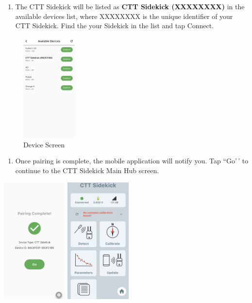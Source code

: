 \documentclass[
]{article}
\providecommand{\tightlist}{%
  \setlength{\itemsep}{0pt}\setlength{\parskip}{0pt}}
\begin{document}
\begin{enumerate}
\def\labelenumi{\arabic{enumi}.}
\setcounter{enumi}{2}
\tightlist
\item
  The CTT Sidekick will be listed as \textbf{CTT Sidekick (XXXXXXXX)} in
  the available devices list, where XXXXXXXX is the unique identifier of
  your CTT Sidekick. Find the your Sidekick in the list and tap Connect.
\end{enumerate}

\begin{figure}
\hypertarget{id}{%
\centering
\includegraphics[width=0.25\textwidth,height=\textheight]{./images/CTT Mobile_3.jpg}
\caption{Device Screen}\label{id}
}
\end{figure}

\begin{enumerate}
\def\labelenumi{\arabic{enumi}.}
\setcounter{enumi}{3}
\tightlist
\item
  Once pairing is complete, the mobile application will notify you. Tap
  ``Go'\,' to continue to the CTT Sidekick Main Hub screen.
\end{enumerate}

\includegraphics[width=0.25\textwidth,height=\textheight]{./images/CTT Mobile_4.jpg}
\includegraphics[width=0.25\textwidth,height=\textheight]{./images/CTT Mobile_5.jpg}
\end{document}
